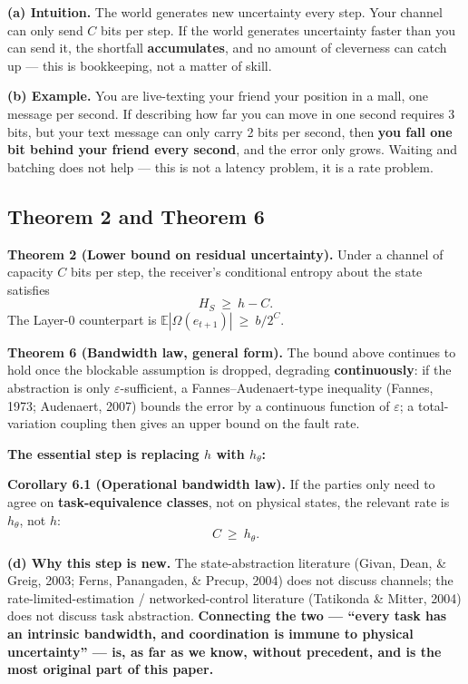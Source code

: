 \documentclass[11pt]{article}
\renewenvironment{quote}
  {\def\FrameCommand{{\color{gray!60}\vrule width 2pt}\hspace{8pt}}%
   \MakeFramed{\advance\hsize-\width \FrameRestore}\begin{itshape}}
  {\end{itshape}\endMakeFramed}
\begin{document}
\textbf{(a) Intuition.} The world generates new uncertainty every step. Your channel can only send \(C\) bits per step. If the world generates uncertainty faster than you can send it, the shortfall \textbf{accumulates}, and no amount of cleverness can catch up --- this is bookkeeping, not a matter of skill.

\textbf{(b) Example.} You are live-texting your friend your position in a mall, one message per second. If describing how far you can move in one second requires 3 bits, but your text message can only carry 2 bits per second, then \textbf{you fall one bit behind your friend every second}, and the error only grows. Waiting and batching does not help --- this is not a latency problem, it is a rate problem.

\hypertarget{theorem-2-and-theorem-6}{%
\subsection{Theorem 2 and Theorem 6}\label{theorem-2-and-theorem-6}}

\begin{quote}
\textbf{Theorem 2 (Lower bound on residual uncertainty).} Under a channel of capacity \(C\) bits per step, the receiver's conditional entropy about the state satisfies
\[H_S\ \ge\ h-C.\]
The Layer-0 counterpart is \(\mathbb E|\Omega(e_{t+1})|\ \ge\ b/2^{C}\).
\end{quote}

\begin{quote}
\textbf{Theorem 6 (Bandwidth law, general form).} The bound above continues to hold once the blockable assumption is dropped, degrading \textbf{continuously}: if the abstraction is only \(\varepsilon\)-sufficient, a Fannes--Audenaert-type inequality (Fannes, 1973; Audenaert, 2007) bounds the error by a continuous function of \(\varepsilon\); a total-variation coupling then gives an upper bound on the fault rate.
\end{quote}

\textbf{The essential step is replacing \(h\) with \(h_\theta\):}

\begin{quote}
\textbf{Corollary 6.1 (Operational bandwidth law).} If the parties only need to agree on \textbf{task-equivalence classes}, not on physical states, the relevant rate is \(h_\theta\), not \(h\):
\[C\ \ge\ h_\theta.\]
\end{quote}

\textbf{(d) Why this step is new.} The state-abstraction literature (Givan, Dean, \& Greig, 2003; Ferns, Panangaden, \& Precup, 2004) does not discuss channels; the rate-limited-estimation / networked-control literature (Tatikonda \& Mitter, 2004) does not discuss task abstraction. \textbf{Connecting the two --- ``every task has an intrinsic bandwidth, and coordination is immune to physical uncertainty'' --- is, as far as we know, without precedent, and is the most original part of this paper.}
\end{document}
